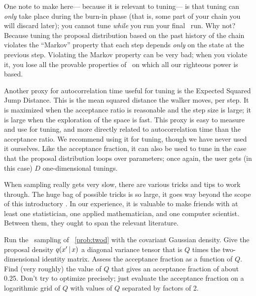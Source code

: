 \documentclass[12pt,twoside,pdftex]{article}
\newcommand{\MCMC}{\acronym{MCMC}}
\begin{document}
One note to make here---%
  because it is relevant to tuning---%
  is that tuning can \emph{only} take place during the burn-in phase
  (that is, some part of your chain you will discard later);
  you cannot tune \emph{while} you run your final \MCMC\ run.
Why not?
Because tuning the proposal distribution based on the past history of the chain
  violates the ``Markov'' property
  that each step depends \emph{only} on the state at the previous step.
Violating the Markov property can be very bad;
  when you violate it,
  you lose all the provable properties of \MCMC\
  on which all our righteous power is based.

Another proxy for autocorrelation time useful for tuning is the
  Expected Squared Jump Distance.
This is the mean squared distance the walker moves, per step.
It is maximized when the acceptance ratio is reasonable
  and the step size is large;
  it is large when the exploration of the space is fast.
This proxy is easy to measure and use for tuning,
  and more directly related to autocorrelation time than the acceptance ratio.
We recommend using it for tuning, though we have never used it ourselves.
Like the acceptance fraction, it can also be used to tune
  in the case that the proposal distribution loops over parameters;
  once again, the user gets (in this case) $D$ one-dimensional tunings.

When sampling really gets very slow,
  there are various tricks and tips to work through.
The huge bag of possible tricks is so large,
  it goes way beyond the scope of this introductory \documentname.
In our experience, it is valuable to make friends with at least one
  statistician, one applied mathematician, and one computer scientist.
Between them, they ought to span the relevant literature.

\begin{problem}\label{prob:tuning}
Run the \MCMC\ sampling of \problemname~\ref{prob:twod} with the
covariant Gaussian density.
Give the proposal density $q(x'\,|\, x)$ a diagonal variance
tensor that is $Q$ times the two-dimensional identity matrix.
Assess the acceptance fraction as a function of $Q$.
Find (very roughly) the value of $Q$ that gives an acceptance
fraction of about 0.25.
Don't try to optimize precisely; just evaluate the acceptance fraction
on a logarithmic grid of $Q$ with values of $Q$ separated by factors
of 2.
\end{problem}
\end{document}
